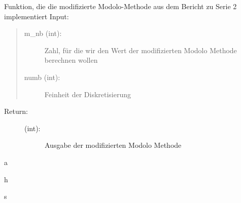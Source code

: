 \documentclass[letterpaper,10pt,ngerman]{sphinxmanual}
\begin{document}
\begin{fulllineitems}
\label{\detokenize{index:aufg_3_2u3_main.modo}}
Funktion, die die modifizierte Modolo-Methode aus dem Bericht zu Serie 2 implementiert
Input:
\begin{quote}
\begin{description}
\item[{m\_nb (int):}] \leavevmode
Zahl, für die wir den Wert der modifizierten Modolo Methode berechnen wollen

\item[{numb (int):}] \leavevmode
Feinheit der Diskretisierung

\end{description}
\end{quote}
\begin{description}
\item[{Return:}] \leavevmode\begin{description}
\item[{(int):}] \leavevmode
Ausgabe der modifizierten Modolo Methode

\end{description}

\end{description}

\end{fulllineitems}



\renewcommand{\indexname}{Python-Modulindex}
\begin{sphinxtheindex}
\def\bigletter#1{{\Large\sffamily#1}\nopagebreak\vspace{1mm}}
\bigletter{a}
\item {}
\item {}
\indexspace
\bigletter{h}
\item {}
\indexspace
\bigletter{s}
\item {}
\end{sphinxtheindex}

\renewcommand{\indexname}{Stichwortverzeichnis}
\printindex
\end{document}
